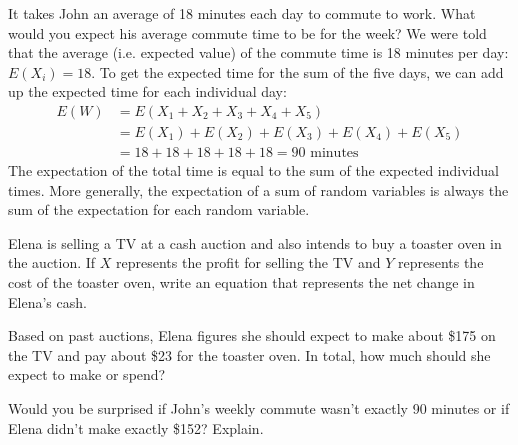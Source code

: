 \begin{examplewrap}
\begin{nexample}{It takes John an average of 18 minutes each day to commute to work. What would you expect his average commute time to be for the week?}
We were told that the average (i.e. expected value) of the commute time is 18 minutes per day: $E(X_i) = 18$. To get the expected time for the sum of the five days, we can add up the expected time for each individual day:
\begin{align*}
E(W) &= E(X_1 + X_2 + X_3 + X_4 + X_5) \\
	&= E(X_1) + E(X_2) + E(X_3) + E(X_4) + E(X_5) \\
	&= 18 + 18 + 18 + 18 + 18 = 90\text{ minutes}
\end{align*}
The expectation of the total time is equal to the sum of the expected individual times. More generally, the expectation of a sum of random variables is always the sum of the expectation for each random variable.
\end{nexample}
\end{examplewrap}

\begin{exercisewrap}
\begin{nexercise} \label{elenaIsSellingATVAndBuyingAToasterOvenAtAnAuction}
Elena is selling a TV at a cash auction and also intends to buy a toaster oven in the auction. If $X$ represents the profit for selling the TV and $Y$ represents the cost of the toaster oven, write an equation that represents the net change in Elena's cash.\footnotemark
\end{nexercise}
\end{exercisewrap}

\begin{exercisewrap}
\begin{nexercise}
Based on past auctions, Elena figures she should expect to make about \$175 on the TV and pay about \$23 for the toaster oven. In total, how much should she expect to make or spend?\footnotemark
\end{nexercise}
\end{exercisewrap}

\begin{exercisewrap}
\begin{nexercise} \label{explainWhyThereIsUncertaintyInTheSum}
Would you be surprised if John's weekly commute wasn't exactly 90 minutes or if Elena didn't make exactly \$152? Explain.\footnotemark
\end{nexercise}
\end{exercisewrap}

